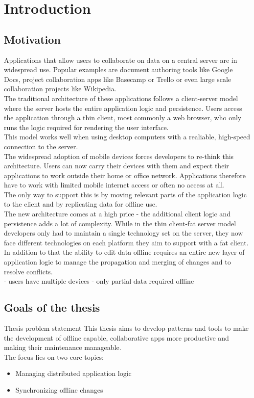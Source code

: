 
\chapter{Introduction}\label{intro}

\section{Motivation}
Applications that allow users to collaborate on data on a central server are in widespread use. Popular examples are document authoring tools like Google Docs, project collaboration apps like Basecamp or Trello or even large scale collaboration projects like Wikipedia.\\
The traditional architecture of these applications follows a client-server model where the server hosts the entire application logic and persistence. Users access the application through a thin client, most commonly a web browser, who only runs the logic required for rendering the user interface.\\
This model works well when using desktop computers with a realiable, high-speed connection to the server.\\
The widespread adoption of mobile devices forces developers to re-think this architecture. Users can now carry their devices with them and expect their applications to work outside their home or office network.
Applications therefore have to work with limited mobile internet access or often no access at all.\\
The only way to support this is by moving relevant parts of the application logic to the client and by replicating data for offline use.\\
The new architecture comes at a high price - the additional client logic and persistence adds a lot of complexity. While in the thin client-fat server model developers only had to maintain a single technology set on the server, they now face different technologies on each platform they aim to support with a fat client.\\
In addition to that the ability to edit data offline requires an entire new layer of application logic to manage the propagation and merging of changes and to resolve conflicts.\\

- users have multiple devices
- only partial data required offline

\section{Goals of the thesis}
Thesis problem statement
This thesis aims to develop patterns and tools to make the development of offline capable, collaborative apps more productive and making their maintenance manageable.\\
The focus lies on two core topics:
\begin{itemize}
\item Managing distributed application logic
\item Synchronizing offline changes
\end{itemize}

